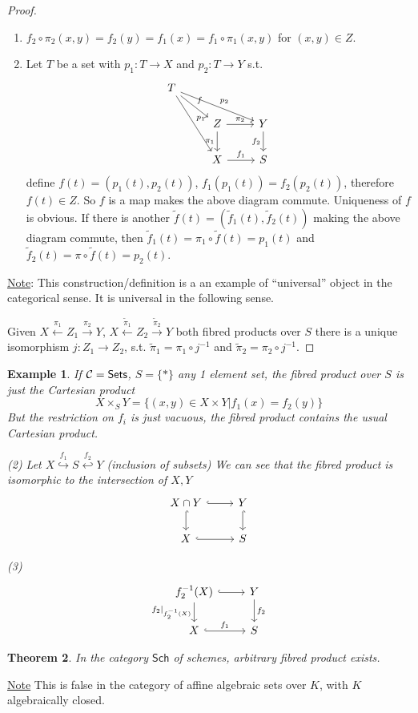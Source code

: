 \documentclass[11pt]{article}
\newtheorem{thm}{Theorem}[section]
\newtheorem{ex}[thm]{Example}
\newcommand{\calc}{{\cal C}}
\newcommand{\lrta}{\longrightarrow}
\newcommand{\inj}{\hookrightarrow}
\begin{document}
\begin{proof}
\ \begin{enumerate}[label=(\arabic*)]
\item $f_2\circ \pi_2(x,y)=f_2(y)=f_1(x)=f_1\circ \pi_1(x,y)$ for $(x,y)\in Z$.
\item Let $T$ be a set with $p_1:T\lrta X$ and $p_2:T\lrta Y$ s.t. $$\begin{tikzcd}
T \arrow[rdd,"p_1"] \arrow[rrd,"p_2"] \ar[rd,"f"] &  &  \\
 & Z \arrow[r, "\pi_2"] \arrow[d, "\pi_1"'] & Y \arrow[d, "f_2"'] \\
 & X \arrow[r, "f_1"] & S
\end{tikzcd}$$
define $f(t)=(p_1(t),p_2(t))$, $f_1(p_1(t))=f_2(p_2(t))$, therefore $f(t)\in Z$. So $f$ is a map makes the  above diagram commute. Uniqueness of $f$ is obvious. If there is  another $\tilde{f}(t)=(\tilde{f}_1(t),\tilde{f}_2(t))$ making the above diagram commute, then $\tilde{f}_1(t)=\pi_1\circ \tilde{f}(t)=p_1(t)$ and $\tilde{f}_2(t)=\pi\circ \tilde{f}(t)=p_2(t)$.
\end{enumerate}
\underline{Note}: This construction/definition is a an example of ``universal'' object in the categorical sense. It is universal in the following sense.

Given $X\overset{\pi_1}{\longleftarrow}Z_1\overset{\pi_2}{\lrta} Y$, $X\overset{\tilde{\pi}_1}{\longleftarrow}Z_2\overset{\tilde{\pi}_2}{\lrta} Y$ both fibred products over $S$ there is a unique isomorphism $j:Z_1\lrta Z_2$, s.t. $\tilde{\pi}_1=\pi_1\circ j^{-1}$ and $\tilde{\pi}_2=\pi_2\circ j^{-1}$.
\end{proof}
\begin{ex}
If $\calc=\mathsf{Sets}$, $S=\{*\}$ any 1 element set, the fibred product over $S$ is just the Cartesian product
$$
X\times_S Y=\{(x,y)\in X\times Y|f_1(x)=f_2(y)\}
$$
But the restriction on $f_i$ is just vacuous, the fibred product contains the usual Cartesian product.

(2) Let $X\overset{f_1}{\inj}S \overset{f_2}{\hookleftarrow} Y$ (inclusion of subsets) We can see that the fibred product is isomorphic to the intersection of $X,Y$
$$
\begin{tikzcd}
X\cap Y \arrow[d, hook] \arrow[r, hook] & Y \arrow[d, hook] \\
X \arrow[r, hook] & S
\end{tikzcd}
$$

(3) $$
\begin{tikzcd}
f_2^{-1}(X) \arrow[d, "f_2|_{f^{-1}_2(X)}"'] \arrow[r, hook] & Y \arrow[d, "f_2"] \\
X \arrow[r, "f_1", hook] & S
\end{tikzcd}
$$
\end{ex}
\begin{thm}
In the category $\mathsf{Sch}$ of schemes, arbitrary fibred product exists.
\end{thm}
\underline{Note} This is false in the category of affine algebraic sets over $K$, with $K$ algebraically closed.
\end{document}
